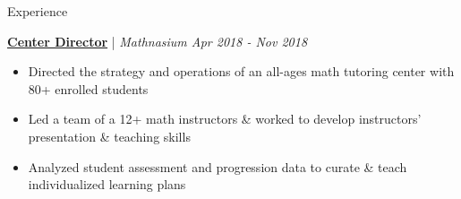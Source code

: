 \documentclass{resume/resume}
\begin{document}
\begin{rSection}{Experience}
  
  \href{https://www.mathnasium.com/bountiful}{\bf Center Director} | {\em Mathnasium \hfill Apr 2018 - Nov 2018}
  \vspace{-6pt}
  \begin{itemize}[nosep]
    \item Directed the strategy and operations of an all-ages math tutoring center with 80+ enrolled students
    \item Led a team of a 12+ math instructors \& worked to develop instructors' presentation \& teaching skills
    \item Analyzed student assessment and progression data to curate \& teach individualized learning plans
  \end{itemize}
  

  

\end{rSection}
\end{document}
